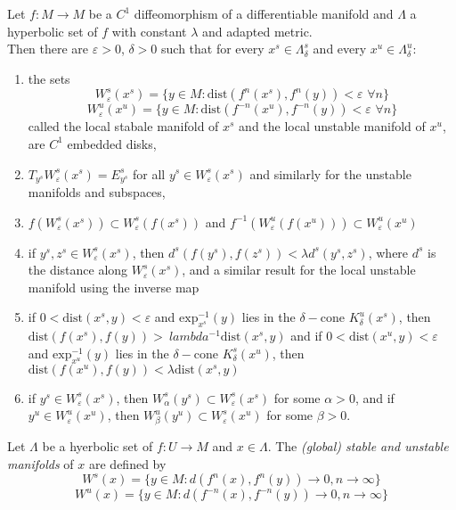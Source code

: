 \begin{thm}

Let $f:M \to M$ be a $C^1$ diffeomorphism of a differentiable manifold and $\Lambda$ a hyperbolic set of $f$ with constant $\lambda$ and adapted metric.\\
\indent Then there are $\varepsilon >0$, $\delta > 0$ such that for every $x^s \in \Lambda^s_{\delta}$ and every $x^u \in \Lambda^u_{\delta}$:

\begin{enumerate}
    \item the sets
    \[W^s_{\varepsilon}(x^s) = \{ y \in M : \mathrm{dist}(f^n(x^s), f^n(y)) < \varepsilon \hspace{4pt} \forall n \}\]
    \[
    W^u_{\varepsilon}(x^u) = \{ y \in M: \mathrm{dist}(f^{-n}(x^u), f^{-n}(y)) < \varepsilon \hspace{4pt} \forall n\}
    \]
    called the local stabale manifold of $x^s$ and the local unstable manifold of $x^u$, are $C^1$ embedded disks,
    \item $T_{y^s}W^s_{\varepsilon}(x^s) = E^s_{y^s}$ for all $y^s \in W^s_{\varepsilon}(x^s)$ and similarly for the unstable manifolds and subspaces,
    \item $f(W^s_{\varepsilon}(x^s)) \subset W^s_{\varepsilon}(f(x^s))$ and $f^{-1}(W^u_{\varepsilon}(f(x^u))) \subset W^u_{\varepsilon}(x^u)$
    \item if $y^s, z^s \in W^s_{\varepsilon}(x^s)$, then $d^s(f(y^s),f(z^s)) < \lambda d^s(y^s, z^s)$, where $d^s$ is the distance along $W^s_{\varepsilon}(x^s)$, and a similar result for the local unstable manifold using the inverse map
    \item if $0 < \mathrm{dist}(x^s,y) < \varepsilon$ and $\mathrm{exp}^{-1}_{x^s}(y)$ lies in the $\delta-$cone $K^u_{\delta}(x^s)$, then $\mathrm{dist}(f(x^s),f(y)) >\ lambda^{-1} \mathrm{dist}(x^s,y)$ and if $0 < \mathrm{dist}(x^u,y) < \varepsilon $ and $\mathrm{exp}^{-1}_{x^u}(y)$ lies in the $\delta-$cone $K^s_{\delta}(x^u)$, then $\mathrm{dist}(f(x^u),f(y)) < \lambda \mathrm{dist}(x^s,y)$
    \item if $y^s \in W^s_{\varepsilon}(x^s)$, then $W^s_{\alpha}(y^s) \subset W^s_{\varepsilon}(x^s)$ for some $\alpha > 0$, and if $y^u \in W^u_{\varepsilon}(x^u)$, then $W^u_{\beta}(y^u) \subset W^s_{\varepsilon}(x^u)$ for some $\beta > 0$.
\end{enumerate}
\end{thm}

Let $\Lambda$ be a hyerbolic set of $f:U \to M$ and $x \in \Lambda$. The \textit{(global) stable and unstable manifolds} of $x$ are defined by 
\[
W^s(x) = \{ y \in M: d(f^n(x), f^n(y)) \to 0, n \to \infty \}
\]
\[
W^u(x) = \{ y \in M: d(f^{-n}(x), f^{-n}(y)) \to 0, n \to \infty \}
\]

